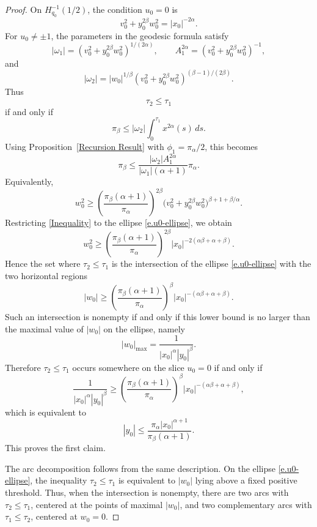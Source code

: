\documentclass[12pt]{amsart}
\numberwithin{equation}{section}
\theoremstyle{plain}
\theoremstyle{definition}
\theoremstyle{remark}
\begin{document}
\begin{proof}
    On \(H_{q_0}^{-1}(1/2)\), the condition \(u_0=0\) is
    \begin{equation}\label{e.u0-ellipse}
        v_0^2+y_0^{2\beta}w_0^2
        =
        |x_0|^{-2\alpha}.
    \end{equation}
    For \(u_0\neq\pm1\), the parameters in the geodesic formula satisfy
    \begin{equation}\label{parameter formulae}
        |\omega_1|
        =
        (v_0^2+y_0^{2\beta}w_0^2)^{1/(2\alpha)},
        \qquad
        A_1^{2\alpha}
        =
        (v_0^2+y_0^{2\beta}w_0^2)^{-1},
    \end{equation}
    and
    \[
        |\omega_2|
        =
        |w_0|^{1/\beta}
        (v_0^2+y_0^{2\beta}w_0^2)^{(\beta-1)/(2\beta)}.
    \]
    Thus
    \[
        \tau_2\leq\tau_1
    \]
    if and only if
    \[
        \pi_\beta
        \leq
        |\omega_2|\int_0^{\tau_1}x^{2\alpha}(s)\,ds.
    \]
    Using Proposition~\ref{Recursion Result} with \(\phi_1=\pi_\alpha/2\), this becomes
    \[
        \pi_\beta
        \leq
        \frac{|\omega_2|A_1^{2\alpha}}{|\omega_1|(\alpha+1)}\pi_\alpha.
    \]
    Equivalently,
    \begin{equation}\label{Inequality}
        w_0^2
        \geq
        \left(
        \frac{\pi_\beta(\alpha+1)}{\pi_\alpha}
        \right)^{2\beta}
        \bigl(v_0^2+y_0^{2\beta}w_0^2\bigr)^{\beta+1+\beta/\alpha}.
    \end{equation}
    Restricting \eqref{Inequality} to the ellipse \eqref{e.u0-ellipse}, we obtain
    \[
        w_0^2
        \geq
        \left(
        \frac{\pi_\beta(\alpha+1)}{\pi_\alpha}
        \right)^{2\beta}
        |x_0|^{-2(\alpha\beta+\alpha+\beta)}.
    \]
    Hence the set where \(\tau_2\leq\tau_1\) is the intersection of the ellipse
    \eqref{e.u0-ellipse} with the two horizontal regions
    \[
        |w_0|\geq
        \left(
        \frac{\pi_\beta(\alpha+1)}{\pi_\alpha}
        \right)^\beta
        |x_0|^{-(\alpha\beta+\alpha+\beta)}.
    \]
    Such an intersection is nonempty if and only if this lower bound is no larger than the
    maximal value of \(|w_0|\) on the ellipse, namely
    \[
        |w_0|_{\max}
        =
        \frac{1}{|x_0|^\alpha |y_0|^\beta}.
    \]
    Therefore \(\tau_2\leq\tau_1\) occurs somewhere on the slice \(u_0=0\) if and only if
    \[
        \frac{1}{|x_0|^\alpha |y_0|^\beta}
        \geq
        \left(
        \frac{\pi_\beta(\alpha+1)}{\pi_\alpha}
        \right)^\beta
        |x_0|^{-(\alpha\beta+\alpha+\beta)},
    \]
    which is equivalent to
    \[
        |y_0|
        \leq
        \frac{\pi_\alpha |x_0|^{\alpha+1}}
        {\pi_\beta(\alpha+1)}.
    \]
    This proves the first claim.

    The arc decomposition follows from the same description. On the ellipse
    \eqref{e.u0-ellipse}, the inequality \(\tau_2\leq\tau_1\) is equivalent to
    \(|w_0|\) lying above a fixed positive threshold. Thus, when the intersection is nonempty,
    there are two arcs with \(\tau_2\leq\tau_1\), centered at the points of maximal
    \(|w_0|\), and two complementary arcs with \(\tau_1\leq\tau_2\), centered at \(w_0=0\).
\end{proof}
\end{document}
